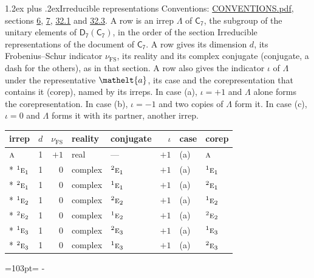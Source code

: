 \documentclass[10pt,a4paper]{article}
\makeatletter
\renewcommand\section{\@startsection{section}{1}{\z@}{-3ex plus -1ex minus -.2ex}%
  {1.2ex plus .2ex}{\normalfont\large\sffamily\bfseries\color{parttitle}}}
\newcommand{\needspace}[1]{\par\penalty-100\begingroup\dimen0=#1\relax\dimen2=\pagegoal
  \advance\dimen2-\pagetotal\ifdim\dimen0>\dimen2\relax\ifdim\dimen2>0pt\vfil\break\fi\fi
  \endgroup}
\numberwithin{equation}{section}
\newcommand{\eltfont}[1]{{\let\sigma\eltsigma\mathelt{#1}}}
\newcommand{\grp}[1]{\mathsf{#1}}
\newcommand{\irr}[1]{\text{\normalfont\scshape #1}}
\newcommand{\conjpair}[1]{{}^{#1}}
\newcommand{\elt}[1]{\eltfont{#1}}
\newcommand{\fsind}{\nu_{\mathrm{FS}}}
\makeatother
\begin{document}
\section{Irreducible representations}\label{s:irreps}
Conventions: \href{../../CONVENTIONS.pdf}{CONVENTIONS.pdf}, sections \href{../../../rotation/CONVENTIONS.pdf\#conv.6}{6}, \href{../../../rotation/CONVENTIONS.pdf\#conv.7}{7}, \href{../../CONVENTIONS.pdf\#conv.32.1}{32.1} and \href{../../CONVENTIONS.pdf\#conv.32.3}{32.3}.
\leavevmode\label{n:irrep.Delta}A row is an irrep $\Lambda$ of $\grp{C_{7}}$, the subgroup of the unitary elements of $\grp{D_{7}}(\grp{C_{7}})$, in the order of the section Irreducible representations of the document of \href{../../../rotation/data/pdf/C7.pdf}{$\grp{C_{7}}$}. \label{n:index.dimension}\label{n:index.frobenius}\label{n:head.irrep}\label{n:head.reality}\label{n:head.conjugate}A row gives its dimension $d$, its Frobenius--Schur indicator $\fsind$, its reality and its complex conjugate (conjugate, a dash for the others), as in that section. \label{n:head.case.corep}\label{n:head.corep}A row also gives the indicator $\iota$ of $\Lambda$ under the representative $\elt{a}$, its case and the corepresentation that contains it (corep), named by its irreps. In case (a), $\iota = +1$ and $\Lambda$ alone forms the corepresentation. In case (b), $\iota = -1$ and two copies of $\Lambda$ form it. In case (c), $\iota = 0$ and $\Lambda$ forms it with its partner, another irrep.
\setlength{\emergencystretch}{2em}\par\setlength{\emergencystretch}{0pt}
{\small\renewcommand{\arraystretch}{1.25}\setlength{\tabcolsep}{4pt}\begin{longtable}{@{}lrrllrll@{}}\toprule
irrep & $d$ & $\fsind$ & reality & conjugate & $\iota$ & case & corep\\\midrule\endhead
\bottomrule\endfoot\endlastfoot
$\irr{a}$ & 1 & $+1$ & real & --- & $+1$ & (a) & $\irr{a}$\\*
$\conjpair{1}\irr{e}_{1}$ & 1 & $0$ & complex & $\conjpair{2}\irr{e}_{1}$ & $+1$ & (a) & $\conjpair{1}\irr{e}_{1}$\\*
$\conjpair{2}\irr{e}_{1}$ & 1 & $0$ & complex & $\conjpair{1}\irr{e}_{1}$ & $+1$ & (a) & $\conjpair{2}\irr{e}_{1}$\\*
$\conjpair{1}\irr{e}_{2}$ & 1 & $0$ & complex & $\conjpair{2}\irr{e}_{2}$ & $+1$ & (a) & $\conjpair{1}\irr{e}_{2}$\\*
$\conjpair{2}\irr{e}_{2}$ & 1 & $0$ & complex & $\conjpair{1}\irr{e}_{2}$ & $+1$ & (a) & $\conjpair{2}\irr{e}_{2}$\\*
$\conjpair{1}\irr{e}_{3}$ & 1 & $0$ & complex & $\conjpair{2}\irr{e}_{3}$ & $+1$ & (a) & $\conjpair{1}\irr{e}_{3}$\\*
$\conjpair{2}\irr{e}_{3}$ & 1 & $0$ & complex & $\conjpair{1}\irr{e}_{3}$ & $+1$ & (a) & $\conjpair{2}\irr{e}_{3}$\\
\bottomrule\end{longtable}}
\needspace{103pt}
\end{document}

